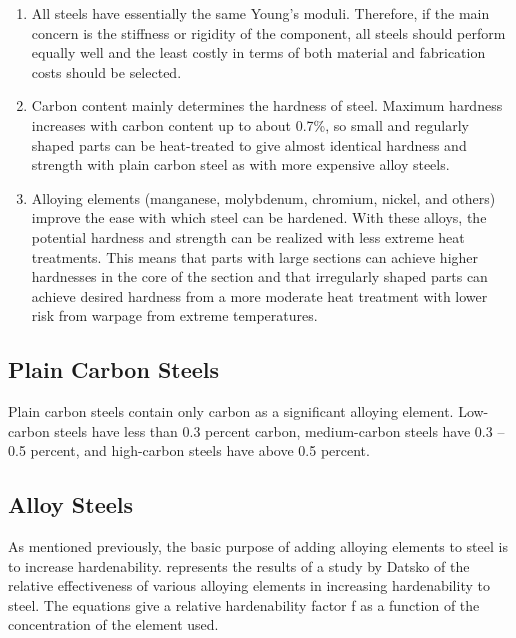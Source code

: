 \documentclass[a4paper,openany,12pt]{book}
\begin{document}
\begin{enumerate}
\item All steels have essentially the same Young's moduli. Therefore, if
the main concern is the stiffness or rigidity of the component, all
steels should perform equally well and the least costly in terms of
both material and fabrication costs should be selected.

\item Carbon content mainly determines the hardness of steel. Maximum
hardness increases with carbon content up to about 0.7\%, so small and
regularly shaped parts can be heat-treated to give almost identical
hardness and strength with plain carbon steel as with more expensive
alloy steels.

\item Alloying elements (manganese, molybdenum, chromium, nickel, and
others) improve the ease with which steel can be hardened. With these
alloys, the potential hardness and strength can be realized with less
extreme heat treatments. This means that parts with large sections
can achieve higher hardnesses in the core of the section and that
irregularly shaped parts can achieve desired hardness from a more
moderate heat treatment with lower risk from warpage from extreme
temperatures.
\end{enumerate}

\subsection{Plain Carbon Steels}
\label{sec:orgfdb72c0}
Plain carbon steels contain only carbon as a significant alloying
element. Low-carbon steels have less than 0.3 percent carbon,
medium-carbon steels have 0.3 -- 0.5 percent, and high-carbon steels
have above 0.5 percent.

\subsection{Alloy Steels}
\label{sec:orgd4d9398}
As mentioned previously, the basic purpose of adding alloying elements
to steel is to increase hardenability. represents the results of a study
by Datsko \cite{datsko1977materials} of the relative effectiveness of
various alloying elements in increasing hardenability to steel. The
equations give a relative hardenability factor f as a function of the
concentration of the element used.
\end{document}
